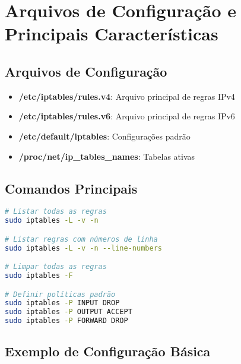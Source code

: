 \documentclass[12pt,fleqn]{article}
\begin{document}
\section {Arquivos de Configuração e Principais Características}

\subsection{Arquivos de Configuração}

\begin{itemize}
    \item \textbf{/etc/iptables/rules.v4}: Arquivo principal de regras IPv4
    \item \textbf{/etc/iptables/rules.v6}: Arquivo principal de regras IPv6
    \item \textbf{/etc/default/iptables}: Configurações padrão
    \item \textbf{/proc/net/ip\_tables\_names}: Tabelas ativas
\end{itemize}

\subsection{Comandos Principais}

\begin{lstlisting}[language=bash, caption=Comandos básicos do iptables]
# Listar todas as regras
sudo iptables -L -v -n

# Listar regras com números de linha
sudo iptables -L -v -n --line-numbers

# Limpar todas as regras
sudo iptables -F

# Definir políticas padrão
sudo iptables -P INPUT DROP
sudo iptables -P OUTPUT ACCEPT
sudo iptables -P FORWARD DROP
\end{lstlisting}

\subsection{Exemplo de Configuração Básica}
\end{document}
